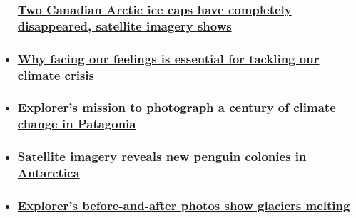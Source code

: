 \begin{itemize}
{  \subsubsection{\texorpdfstring{\href{/2020/08/05/weather/st-patrick-bay-ice-caps-climate-change-trnd-scn/index.html}{Two
  Canadian Arctic ice caps have completely disappeared, satellite
  imagery
  shows}}{Two Canadian Arctic ice caps have completely disappeared, satellite imagery shows}}\label{two-canadian-arctic-ice-caps-have-completely-disappeared-satellite-imagery-shows}}
\item
  \hypertarget{why-facing-our-feelings-is-essential-for-tackling-our-climate-crisis}{%
  \subsubsection{\texorpdfstring{\href{/2020/04/23/opinions/climate-crisis-psychology-lertzman/index.html}{Why
  facing our feelings is essential for tackling our climate
  crisis}}{Why facing our feelings is essential for tackling our climate crisis}}\label{why-facing-our-feelings-is-essential-for-tackling-our-climate-crisis}}
\item
  \hypertarget{explorers-mission-to-photograph-a-century-of-climate-change-in-patagonia}{%
  \subsubsection{\texorpdfstring{\href{/2020/08/04/americas/cristian-donoso-patagonia-climate-change-spc-c2e-intl-scn/index.html}{Explorer's
  mission to photograph a century of climate change in
  Patagonia}}{Explorer's mission to photograph a century of climate change in Patagonia}}\label{explorers-mission-to-photograph-a-century-of-climate-change-in-patagonia}}
\item
  \hypertarget{satellite-imagery-reveals-new-penguin-colonies-in-antarctica}{%
  \subsubsection{\texorpdfstring{\href{/2020/08/05/world/penguins-antarctica-satellite-scn-scli-intl/index.html}{Satellite
  imagery reveals new penguin colonies in
  Antarctica}}{Satellite imagery reveals new penguin colonies in Antarctica}}\label{satellite-imagery-reveals-new-penguin-colonies-in-antarctica}}
\item
  \hypertarget{explorers-before-and-after-photos-show-glaciers-melting}{%
  \subsubsection{\texorpdfstring{\href{/videos/world/2020/07/29/cristian-donoso-glaciers-patagonia-cte.cnn}{Explorer's
  before-and-after photos show glaciers
  melting}}{Explorer's before-and-after photos show glaciers melting}}\label{explorers-before-and-after-photos-show-glaciers-melting}}
\end{itemize}

